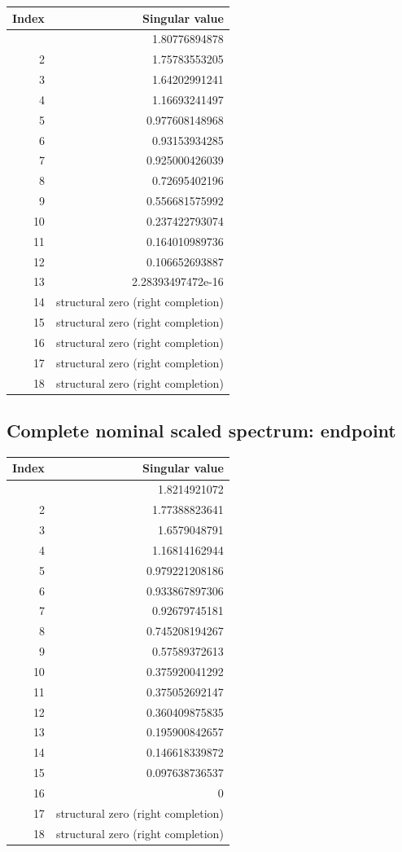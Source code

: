 \begin{longtable}[]{@{}rr@{}}
\toprule\noalign{}
Index & Singular value \\
\midrule\noalign{}
\endhead
\bottomrule\noalign{}
\endlastfoot
1 & 1.80776894878 \\
2 & 1.75783553205 \\
3 & 1.64202991241 \\
4 & 1.16693241497 \\
5 & 0.977608148968 \\
6 & 0.93153934285 \\
7 & 0.925000426039 \\
8 & 0.72695402196 \\
9 & 0.556681575992 \\
10 & 0.237422793074 \\
11 & 0.164010989736 \\
12 & 0.106652693887 \\
13 & 2.28393497472e-16 \\
14 & structural zero (right completion) \\
15 & structural zero (right completion) \\
16 & structural zero (right completion) \\
17 & structural zero (right completion) \\
18 & structural zero (right completion) \\
\end{longtable}

\hypertarget{complete-nominal-scaled-spectrum-endpoint}{%
\subsection{Complete nominal scaled spectrum: endpoint}\label{complete-nominal-scaled-spectrum-endpoint}}

\begin{longtable}[]{@{}rr@{}}
\toprule\noalign{}
Index & Singular value \\
\midrule\noalign{}
\endhead
\bottomrule\noalign{}
\endlastfoot
1 & 1.8214921072 \\
2 & 1.77388823641 \\
3 & 1.6579048791 \\
4 & 1.16814162944 \\
5 & 0.979221208186 \\
6 & 0.933867897306 \\
7 & 0.92679745181 \\
8 & 0.745208194267 \\
9 & 0.57589372613 \\
10 & 0.375920041292 \\
11 & 0.375052692147 \\
12 & 0.360409875835 \\
13 & 0.195900842657 \\
14 & 0.146618339872 \\
15 & 0.097638736537 \\
16 & 0 \\
17 & structural zero (right completion) \\
18 & structural zero (right completion) \\
\end{longtable}

